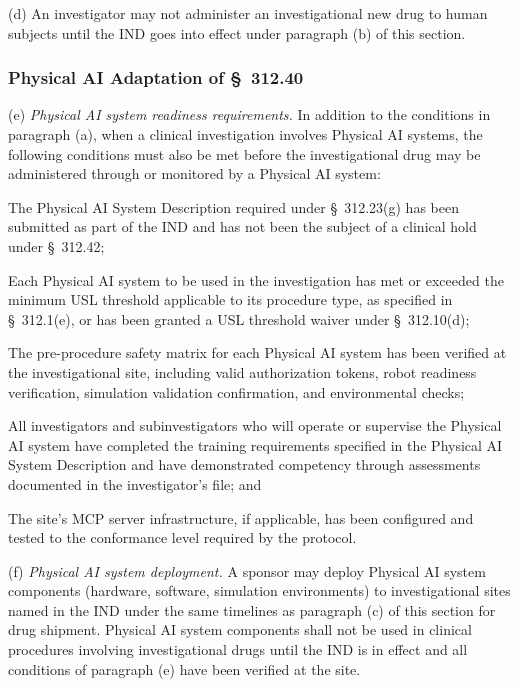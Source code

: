 \documentclass[11pt]{article}
\begin{document}
(d) An investigator may not administer an investigational new drug to human subjects until the IND goes into effect under paragraph (b) of this section.

\subsubsection{Physical AI Adaptation of \S~312.40}

(e) \textit{Physical AI system readiness requirements.} In addition to the conditions in paragraph (a), when a clinical investigation involves Physical AI systems, the following conditions must also be met before the investigational drug may be administered through or monitored by a Physical AI system:

\begin{description}[leftmargin=0.8cm,style=sameline]
\item[(i)] The Physical AI System Description required under \S~312.23(g) has been submitted as part of the IND and has not been the subject of a clinical hold under \S~312.42;
\item[(ii)] Each Physical AI system to be used in the investigation has met or exceeded the minimum USL threshold applicable to its procedure type, as specified in \S~312.1(e), or has been granted a USL threshold waiver under \S~312.10(d);
\item[(iii)] The pre-procedure safety matrix for each Physical AI system has been verified at the investigational site, including valid authorization tokens, robot readiness verification, simulation validation confirmation, and environmental checks;
\item[(iv)] All investigators and subinvestigators who will operate or supervise the Physical AI system have completed the training requirements specified in the Physical AI System Description and have demonstrated competency through assessments documented in the investigator's file; and
\item[(v)] The site's MCP server infrastructure, if applicable, has been configured and tested to the conformance level required by the protocol.
\end{description}

(f) \textit{Physical AI system deployment.} A sponsor may deploy Physical AI system components (hardware, software, simulation environments) to investigational sites named in the IND under the same timelines as paragraph (c) of this section for drug shipment. Physical AI system components shall not be used in clinical procedures involving investigational drugs until the IND is in effect and all conditions of paragraph (e) have been verified at the site.
\end{document}
